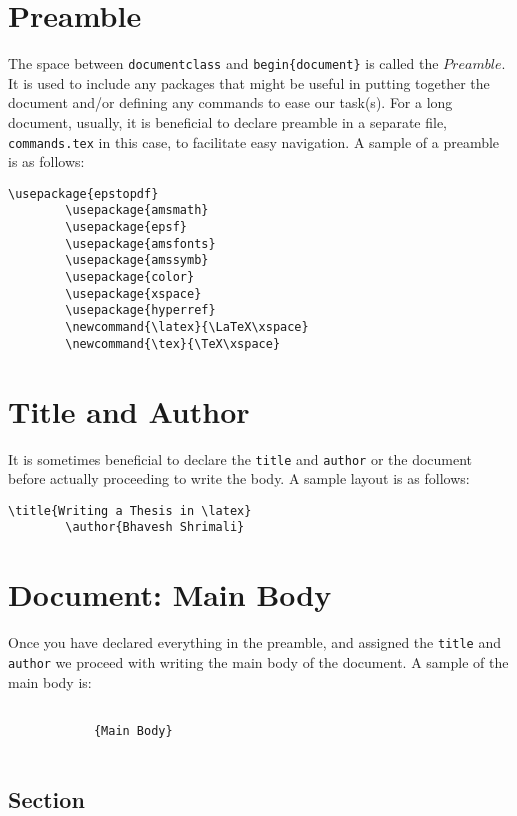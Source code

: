 \section{Preamble}
The space between \texttt{documentclass} and \texttt{begin\{document\}} is called the $Preamble$. It is used to include any packages that might be useful in putting together the document and/or defining any commands to ease our task(s). For a long document, usually, it is beneficial to declare preamble in a separate file, \texttt{commands.tex} in this case, to facilitate easy navigation. A sample of a preamble is as follows: \\
\begin{lstlisting}[frame=single]
		\usepackage{epstopdf}
		\usepackage{amsmath}
		\usepackage{epsf}
		\usepackage{amsfonts}
		\usepackage{amssymb}
		\usepackage{color}
		\usepackage{xspace}
		\usepackage{hyperref}
		\newcommand{\latex}{\LaTeX\xspace}
		\newcommand{\tex}{\TeX\xspace}
\end{lstlisting}\newpage
\section{Title and Author}
It is sometimes beneficial to declare the \texttt{title} and \texttt{author} or the document before actually proceeding to write the body. A sample layout is as follows: \\
\begin{lstlisting}[frame=single]
		\title{Writing a Thesis in \latex}
		\author{Bhavesh Shrimali}
\end{lstlisting}
\section{Document: Main Body}
Once you have declared everything in the preamble, and assigned the \texttt{title} and \texttt{author} we proceed with writing the main body of the document. A sample of the main body is: \\
\begin{lstlisting}[frame=single]
		
			{Main Body}
		
\end{lstlisting}
\subsection{Section}
